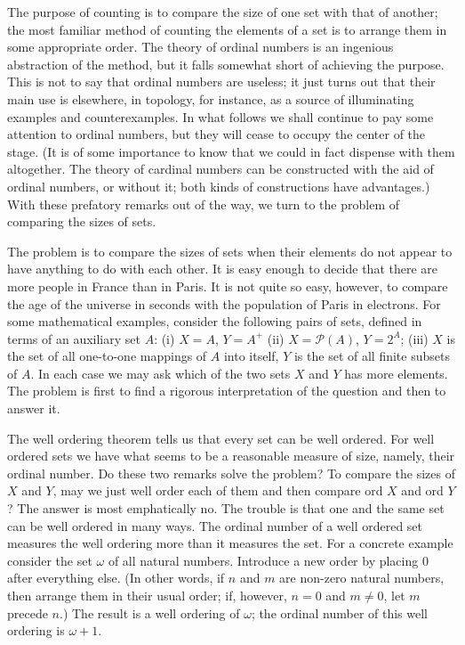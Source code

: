 
The purpose of counting is to compare the size of one set with that of another; the most familiar method of counting the elements of a set is to arrange them in some appropriate order. The theory of ordinal numbers is an ingenious abstraction of the method, but it falls somewhat short of achieving the purpose. This is not to say that ordinal numbers are useless; it just turns out that their main use is elsewhere, in topology, for instance, as a source of illuminating examples and counterexamples. In what follows we shall continue to pay some attention to ordinal numbers, but they will cease to occupy the center of the stage. (It is of some importance to know that we could in fact dispense with them altogether. The theory of cardinal numbers can be constructed with the aid of ordinal numbers, or without it; both kinds of constructions have advantages.) With these prefatory remarks out of the way, we turn to the problem of comparing the sizes of sets. 

The problem is to compare the sizes of sets when their elements do not appear to have anything to do with each other. It is easy enough to decide that there are more people in France than in Paris. It is not quite so easy, however, to compare the age of the universe in seconds with the population of Paris in electrons. For some mathematical examples, consider the following pairs of sets, defined in terms of an auxiliary set $A$: (i) $X = A$, $Y = A^{+}$ (ii) $X = \mathcal{P}(A)$, $Y = 2^{A}$; (iii) $X$ is the set of all one-to-one mappings of $A$ into itself, $Y$ is the set of all finite subsets of $A$. In each case we may ask which of the two sets $X$ and $Y$ has more elements. The problem is first to find a rigorous interpretation of the question and then to answer it. 

The well ordering theorem tells us that every set can be well ordered. For well ordered sets we have what seems to be a reasonable measure of size, namely, their ordinal number. Do these two remarks solve the problem? To compare the sizes of $X$ and $Y$, may we just well order each of them and then compare ord $X$ and ord $Y$? The answer is most emphatically no. The trouble is that one and the same set can be well ordered in many ways. The ordinal number of a well ordered set measures the well ordering more than it measures the set. For a concrete example consider the set $\omega$ of all natural numbers. Introduce a new order by placing $0$ after everything else. (In other words, if $n$ and $m$ are non-zero natural numbers, then arrange them in their usual order; if, however, $n = 0$ and $m \neq 0$, let $m$ precede $n$.) The result is a well ordering of $\omega$; the ordinal number of this well ordering is $\omega + 1$.

